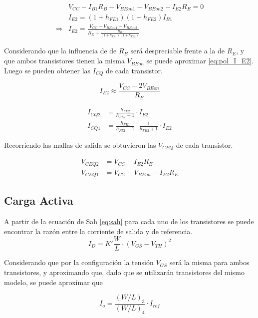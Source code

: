 \begin{align*}
    & V_{CC}-I_{B1}R_{B}-V_{BEon1}-V_{BEon2}-I_{E2}R_{E}=0 \\
    & I_{E2} = \left(1 + h_{FE1}\right)\left(1 + h_{FE2}\right) I_{B1} \\
    \Rightarrow & I_{E2} = \frac{V_{CC}-V_{BEon1}-V_{BEon2}}{R_E+\frac{R_B}{\left(1 + h_{FE1}\right)\left(1 + h_{FE2}\right)}}
\end{align*}

Considerando que la influencia de de $R_B$ será despreciable frente a la de $R_E$, y que ambos transistores tienen la misma $V_{BEon}$ se puede aproximar \eqref{eq:pol_I_E2}. Luego se pueden obtener las $I_{CQ}$ de cada transistor.

\begin{equation}
    I_{E2} \approx \frac{V_{CC}-2V_{BEon}}{R_E}
    \label{eq:pol_I_E2}
\end{equation}

\begin{align}
    I_{CQ2} &= \frac{h_{FE2}}{h_{FE2}+1}\cdot I_{E2} \label{eq:icq2} \\ 
    I_{CQ1} &= \frac{h_{FE1}}{h_{FE1}+1}\cdot \frac{1}{h_{FE2}+1}\cdot I_{E2} \label{eq:icq1}
\end{align}

Recorriendo las mallas de salida se obtuvieron las $V_{CEQ}$ de cada transistor.

\begin{align}
    V_{CEQ2} &= V_{CC} - I_{E2} R_E \\
    V_{CEQ1} &= V_{CC} - V_{BEon} - I_{E2} R_E
\end{align}

\subsection{Carga Activa}

A partir de la ecuación de Sah \eqref{eq:sah} para cada uno de los transistores se puede encontrar la razón entre la corriente de salida y de referencia.
\begin{equation}
    I_D = K' \frac{W}{L}\cdot (V_{GS}-V_{TH})^2
    \label{eq:sah}
\end{equation}

Considerando que por la configuración la tensión $V_{GS}$ será la misma para ambos transistores, y aproximando que, dado que se utilizarán transistores del mismo modelo, se puede aproximar que 

\begin{equation}
    I_o = \frac{(W/L)_3}{(W/L)_4} \cdot I_{ref}
\end{equation}

